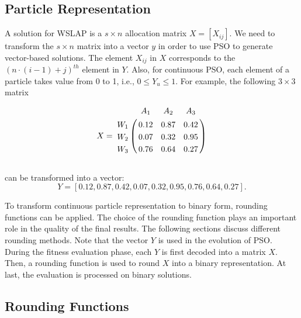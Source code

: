 \documentclass[10pt,journal,compsoc]{IEEEtran}
\let\bbordermatrix\bordermatrix
\begin{document}
\vspace{-3 mm}
\subsection{Particle Representation}
A solution for WSLAP is a $s \times n$ allocation matrix $X =[X_{ij}]$. We need to transform the $s \times n$ matrix into a vector $y$ in order to use PSO to generate vector-based solutions. The element $X_{ij}$ in $X$ corresponds to the $ (n \cdot (i-1) +j)^{th}$ element in $Y$. Also, for continuous PSO, each element of a particle takes value from 0 to 1, i.e., $0 \leq  Y_u  \leq 1$. For example, the following $3 \times 3$ matrix

 \begin{equation*}
\begin{aligned}
 X = \bbordermatrix{~ & A_{1} & A_{2} & A_{3} \cr
      W_{1} &0.12 &0.87 &0.42 \cr
      W_{2} &0.07  &0.32 &0.95 \cr
      W_{3} &0.76 &0.64 &0.27 \cr}\\
\end{aligned}
\end{equation*}\\
can be transformed into a vector:
$$
Y = [0.12, 0.87, 0.42, 0.07, 0.32, 0.95, 0.76, 0.64, 0.27].
$$

To transform continuous particle representation to binary form, rounding functions can be applied. The choice of the rounding function plays an important role in the quality of the final results. The following sections discuss different rounding methods. Note that the vector $Y$ is used in the evolution of PSO. During the fitness evaluation phase, each $Y$ is first decoded into a matrix $X$. Then, a rounding function is used to round $X$ into a binary representation. At last, the evaluation is processed on binary solutions.


\vspace{-3 mm}
\subsection{Rounding Functions}
\end{document}
